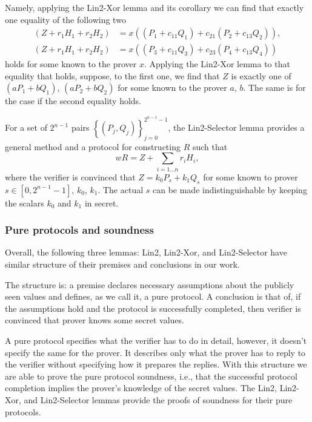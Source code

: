 \documentclass{mathcryptology} %
\theoremstyle{title}
\theoremstyle{titleof}
\begin{document}
    Namely, applying the Lin2-Xor lemma and its corollary we can find that exactly one equality of the following two
    \begin{align*}
        (Z+r_{1}H_{1}+r_{2}H_{2}) & =x((P_{1}+c_{11}Q_{1})+c_{21}(P_{2}+c_{13}Q_{2})),\\
        (Z+r_{1}H_{1}+r_{2}H_{2}) & = x((P_{3}+c_{11}Q_{3})+c_{23}(P_{4}+c_{13}Q_{4}))
    \end{align*}
    holds for some known to the prover $x$. Applying the Lin2-Xor lemma to that equality that holds, suppose, to the first one, we find that $Z$ is exactly one of $(a P_{1}+b Q_{1})$, $(a P_{2}+b Q_{2})$ for some known to the prover $a$, $b$. The same is for the case if the second equality holds.

    For a set of ${2}^{n-1}$ pairs ${\left\{ \left(P_{j}, Q_{j}\right)\right\}}_{j=0}^{2^{n-1}-1}$, the Lin2-Selector lemma provides a general method and a protocol for constructing $R$ such that
    \begin{equation*}
        w R = Z+ \sum_{i=1\dots{}n}r_iH_i,
    \end{equation*}
    where the verifier is convinced that $Z=k_{0}P_{s}+k_{1}Q_{s}$ for some known to prover $s\in\left[0, 2^{n-1}-1\right]$, $k_{0}$, $k_{1}$. The actual $s$ can be made indistinguishable by keeping the scalars $k_{0}$ and $k_{1}$ in secret.
    

\subsubsection{Pure protocols and soundness}
    Overall, the following three lemmas: Lin2, Lin2-Xor, and Lin2-Selector have similar structure of their premises and conclusions in our work.

    The structure is: a premise declares necessary assumptions about the publicly seen values and defines, as we call it, a pure protocol. A conclusion is that of, if the assumptions hold and the protocol is successfully completed, then verifier is convinced that prover knows some secret values.

    A pure protocol specifies what the verifier has to do in detail, however, it doesn't specify the same for the prover. It describes only what the prover has to reply to the verifier without specifying how it prepares the replies.
    With this structure we are able to prove the pure protocol soundness, i.e., that the successful protocol completion implies the prover's knowledge of the secret values. The Lin2, Lin2-Xor, and Lin2-Selector lemmas provide the proofs of soundness for their pure protocols.
\end{document}
